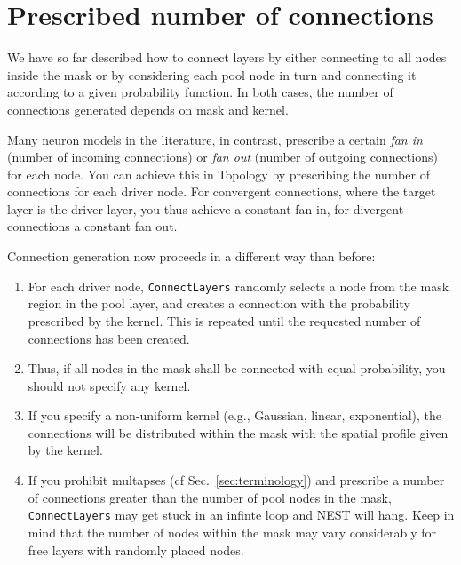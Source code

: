 \documentclass[a4paper,12pt]{report}
\begin{document}
\section{Prescribed number of connections}\label{sec:prescribed_numbers}

We have so far described how to connect layers by either connecting to
all nodes inside the mask or by considering each pool node in turn and
connecting it according to a given probability function. In both
cases, the number of connections generated depends on mask and kernel.

Many neuron models in the literature, in contrast, prescribe a certain
\emph{fan in} (number of incoming connections) or
\emph{fan out} (number of outgoing connections) for
each node. You can achieve this in Topology by prescribing the number
of connections for each driver
node. For convergent connections, where the target layer is the driver
layer, you thus achieve a constant fan in, for divergent connections a
constant fan out.

Connection generation now proceeds in a different way than before:
\begin{enumerate}
\item For each driver node, \lstinline!ConnectLayers! randomly selects
  a node from the mask region in the pool layer, and creates a
  connection with the probability prescribed by the kernel. This is
  repeated until the requested number of connections has been created.
\item Thus, if all nodes in the mask shall be connected with equal
  probability, you should not specify any kernel. 
\item If you specify a non-uniform kernel (e.g., Gaussian, linear,
  exponential), the connections will be distributed within the mask
  with the spatial profile given by the kernel.
\item If you prohibit multapses (cf Sec.~\ref{sec:terminology}) and
  prescribe a number of connections greater than the number of pool nodes
  in the mask, \lstinline!ConnectLayers! may get stuck in an infinte
  loop and NEST will hang. Keep in
  mind that the number of nodes within the mask may vary considerably
  for free layers with randomly placed nodes. 
\end{enumerate}
\end{document}
